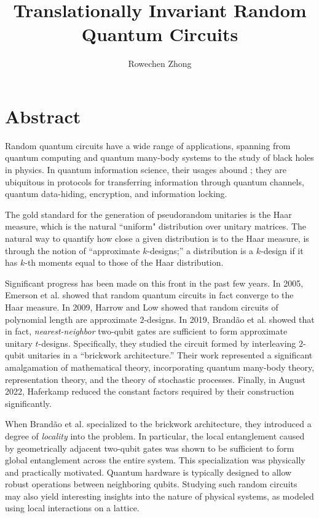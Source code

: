 \documentclass[fleqn,12pt]{article}
\title{Translationally Invariant Random Quantum Circuits}
\author{Rowechen Zhong}
\begin{document}
\maketitle
\section{Abstract}
Random quantum circuits have a wide range of applications,
spanning from quantum computing and quantum many-body systems
to the study of black holes in physics. In quantum information science,
their usages abound \cite{Hayden_2004};
they are ubiquitous in protocols for transferring information through quantum channels,
quantum data-hiding, encryption, and information locking.

The gold standard for the generation of pseudorandom unitaries is the Haar
measure, which is the natural ``uniform" distribution over unitary matrices.
The natural way to quantify how close a given distribution is to the Haar measure,
is through the notion of ``approximate $k$-designs;'' a distribution is a $k$-design if
it has $k$-th moments equal to those of the Haar distribution.

Significant progress has been made on this front in the past few years.
In 2005, Emerson et al. \cite{Emerson_2005} showed that random quantum circuits
in fact converge to the Haar measure.
In 2009, Harrow and Low \cite{Harrow_2009} showed that random circuits of
polynomial length are approximate $2$-designs. In 2019, Brand{\~{a}}o et al. \cite{Brand_o_2016}
showed that in fact, \emph{nearest-neighbor} two-qubit gates are sufficient
to form approximate unitary $t$-designs. Specifically, they studied the circuit formed by
interleaving $2$-qubit unitaries in a ``brickwork architecture.''
Their work represented a significant amalgamation
of mathematical theory, incorporating quantum many-body theory, representation theory, and
the theory of stochastic processes. Finally, in August 2022, Haferkamp \cite{Haferkamp_2022}
reduced the constant factors required by their construction significantly.

When Brand{\~{a}}o et al. specialized to the brickwork architecture, they introduced a
degree of \emph{locality} into the problem. In particular, the local entanglement caused by
geometrically adjacent two-qubit gates was shown to be sufficient to form global entanglement
across the entire system. This specialization was physically and practically motivated.
Quantum hardware is typically designed to allow robust operations between neighboring qubits.
Studying such random circuits may also yield interesting insights into the nature of physical
systems, as modeled using local interactions on a lattice.
\end{document}
